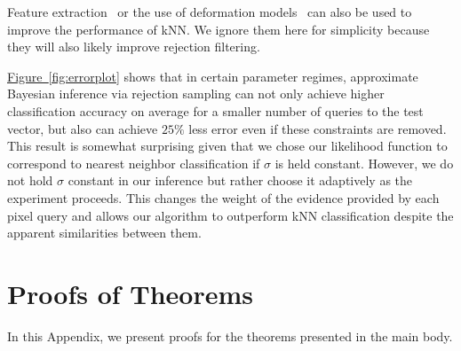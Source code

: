 \documentclass{article} %
\newcommand{\fig}[1]{\hyperref[fig:#1]{Figure~\ref*{fig:#1}}}
\begin{document}
Feature extraction~\cite{zhang2006svm,weinberger2008fast,min2009deep} or the use of 
deformation models~\cite{keysers2007deformation} can also be used to improve the performance of kNN.
We ignore them here for simplicity because they will also likely improve rejection filtering.

\fig{errorplot} shows that in certain parameter regimes, approximate Bayesian inference via rejection sampling can not only achieve higher classification accuracy on average for a smaller
number of queries to the test vector, but also can achieve $25\%$ less error even if these constraints are removed.  This result is somewhat surprising given that we chose our likelihood function to correspond to nearest neighbor classification if $\sigma$ is held constant.  However, we do not hold $\sigma$ constant in our inference but rather choose it adaptively as the experiment proceeds.  This changes the weight of the evidence provided by each pixel query and allows our algorithm to outperform kNN classification despite the apparent similarities between them.

\section{Proofs of Theorems}
\label{app:proofs}

In this Appendix, we present proofs for the theorems presented in the main
body.
\end{document}
